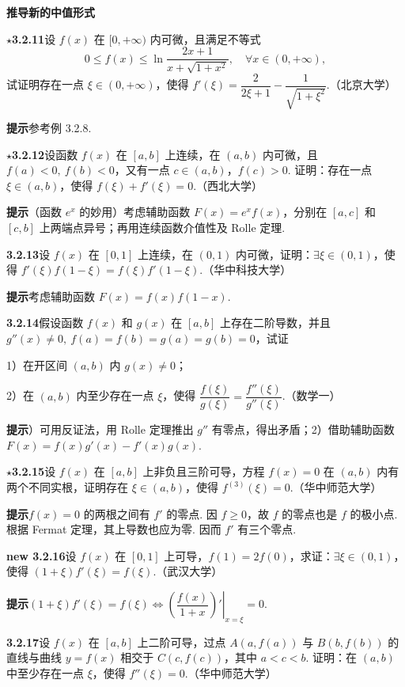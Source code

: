 \documentclass[UTF8, 12pt, fontset=fandol, oneside]{ctexart}
\begin{document}
\noindent\textbf{推导新的中值形式}

\noindent\textbf{$\star$3.2.11}\quad 设 $f(x)$ 在 $[0,+\infty)$ 内可微，且满足不等式
\[
  0\le f(x)\le \ln\frac{2x+1}{x+\sqrt{1+x^2}},\quad \forall x\in(0,+\infty),
\]
试证明存在一点 $\xi\in(0,+\infty)$，使得 $f'(\xi)=\dfrac2{2\xi+1}-\dfrac1{\sqrt{1+\xi^2}}$.（北京大学）

\noindent\textbf{提示}\quad 参考例 3.2.8.

\noindent\textbf{$\star$3.2.12}\quad 设函数 $f(x)$ 在 $[a,b]$ 上连续，在 $(a,b)$ 内可微，且 $f(a)<0,\ f(b)<0$，又有一点 $c\in(a,b)$，$f(c)>0$. 证明：存在一点 $\xi\in(a,b)$，使得 $f(\xi)+f'(\xi)=0$.（西北大学）

\noindent\textbf{提示}\quad （函数 $e^x$ 的妙用）考虑辅助函数 $F(x)=e^xf(x)$，分别在 $[a,c]$ 和 $[c,b]$ 上两端点异号；再用连续函数介值性及 Rolle 定理.

\noindent\textbf{3.2.13}\quad 设 $f(x)$ 在 $[0,1]$ 上连续，在 $(0,1)$ 内可微，证明：$\exists \xi\in(0,1)$，使得 $f'(\xi)f(1-\xi)=f(\xi)f'(1-\xi)$.（华中科技大学）

\noindent\textbf{提示}\quad 考虑辅助函数 $F(x)=f(x)f(1-x)$.

\noindent\textbf{3.2.14}\quad 假设函数 $f(x)$ 和 $g(x)$ 在 $[a,b]$ 上存在二阶导数，并且 $g''(x)\ne0,\ f(a)=f(b)=g(a)=g(b)=0$，试证

1）在开区间 $(a,b)$ 内 $g(x)\ne0$；

2）在 $(a,b)$ 内至少存在一点 $\xi$，使得 $\dfrac{f(\xi)}{g(\xi)}=\dfrac{f''(\xi)}{g''(\xi)}$.（数学一）

\noindent\textbf{提示}）可用反证法，用 Rolle 定理推出 $g''$ 有零点，得出矛盾；2）借助辅助函数 $F(x)=f(x)g' (x)-f'(x)g(x)$.

\noindent\textbf{$\star$3.2.15}\quad 设 $f(x)$ 在 $[a,b]$ 上非负且三阶可导，方程 $f(x)=0$ 在 $(a,b)$ 内有两个不同实根，证明存在 $\xi\in(a,b)$，使得 $f^{(3)}(\xi)=0$.（华中师范大学）

\noindent\textbf{提示}\quad $f(x)=0$ 的两根之间有 $f'$ 的零点. 因 $f\ge0$，故 $f$ 的零点也是 $f$ 的极小点. 根据 Fermat 定理，其上导数也应为零. 因而 $f'$ 有三个零点.

\noindent\textbf{new 3.2.16}\quad 设 $f(x)$ 在 $[0,1]$ 上可导，$f(1)=2f(0)$，求证：$\exists \xi\in(0,1)$，使得 $(1+\xi)f'(\xi)=f(\xi)$.（武汉大学）

\noindent\textbf{提示}\quad $(1+\xi)f'(\xi)=f(\xi)\Leftrightarrow \left.\left(\dfrac{f(x)}{1+x}\right)'\right|_{x=\xi}=0$.

\noindent\textbf{3.2.17}\quad 设 $f(x)$ 在 $[a,b]$ 上二阶可导，过点 $A(a,f(a))$ 与 $B(b,f(b))$ 的直线与曲线 $y=f(x)$ 相交于 $C(c,f(c))$，其中 $a<c<b$. 证明：在 $(a,b)$ 中至少存在一点 $\xi$，使得 $f''(\xi)=0$.（华中师范大学）
\end{document}
